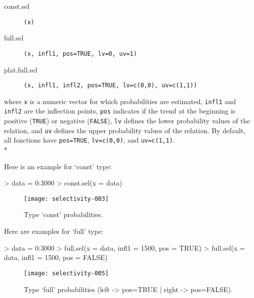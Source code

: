 \documentclass[letterpaper, 12pt]{article}
\begin{document}
\begin{description}
\item[const.sel]\verb#(x)#
\item[full.sel]\verb#(x, infl1, pos=TRUE, lv=0, uv=1)#
\item[plat.full.sel]\verb#(x, infl1, infl2, pos=TRUE, lv=c(0,0), uv=c(1,1))#
\end{description}
where \verb#x# is a numeric vector for which probabilities are estimated, \verb#infl1# and \verb#infl2# are the inflection points, 
\verb#pos# indicates if the trend at the beginning is positive  (\verb#TRUE#) or negative (\verb#FALSE#), \verb#lv# defines the 
lower probability values of the relation, and \verb#uv# defines the upper probability values of the relation. By default, 
all fonctions have \verb#pos=TRUE#, \verb#lv=c(0,0)#, and \verb#uv=c(1,1)#.\\*

Here is an example for `const' type:


\begin{Schunk}
\begin{Sinput}
> data = 0:3000
> const.sel(x = data)
\end{Sinput}
\end{Schunk}

\begin{figure}[h]
\vspace{-20pt}
\begin{center}
\texttt{[image: selectivity-003]}
\end{center}
  \vspace{-30pt}
  \caption{Type `const' probabilities.}
  \vspace{-10pt}
\label{fig1}
\end{figure}
\vspace*{\fill}


\newpage

Here are examples for `full' type:
\begin{Schunk}
\begin{Sinput}
> data = 0:3000
> full.sel(x = data, infl1 = 1500, pos = TRUE)
> full.sel(x = data, infl1 = 1500, pos = FALSE)
\end{Sinput}
\end{Schunk}

\begin{figure}[h]
\vspace{-20pt}
\begin{center}
\texttt{[image: selectivity-005]}
\end{center}
\vspace{-30pt}
\caption{Type `full' probabilities (left -> pos=TRUE |  right -> pos=FALSE).}
\vspace{-10pt}
\label{fig2}
\end{figure}
\end{document}
